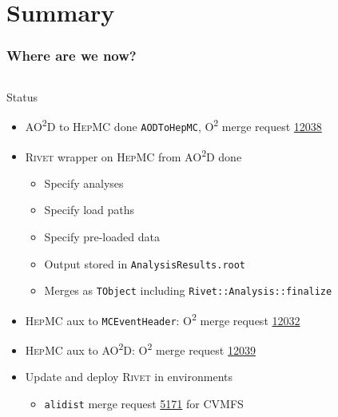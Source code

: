 \documentclass[compress,table,8pt]{beamer}
\newcommand\Rivet{{\scshape Rivet}}
\newcommand\HepMC{{\scshape HepMC}}
\newcommand\Otwo{O\textsuperscript{2}}
\newcommand\AOD{AO\textsuperscript{2}D}
\begin{document}
\section{Summary}
\begin{frame}
  \frametitle{Where are we now?}

  \begin{columns}[onlytextwidth,t]
    \begin{column}{.45\linewidth}
      \begin{block}{Status}
        \begin{itemize}
        \item<+-> \AOD{} to \HepMC{} done\newline%
          {\footnotesize \texttt{AODToHepMC}, \Otwo{} merge request
            \href{https://github.com/AliceO2Group/AliceO2/pull/12038}{12038}}
        \item<+-> \Rivet{} wrapper on \HepMC{} from \AOD{} done
          \begin{itemize}
          \item Specify analyses
          \item Specify load paths
          \item Specify pre-loaded data
          \item Output stored in
            \texttt{AnalysisResults.root}
          \item Merges as \texttt{TObject}\newline%
            {\footnotesize including
              \texttt{Rivet::Analysis::finalize}}
          \end{itemize}
        \item<+-> \HepMC{} aux to \texttt{MCEventHeader}: \Otwo{}
          merge request
          \href{https://github.com/AliceO2Group/AliceO2/pull/12032}{12032}
        \item<+-> \HepMC{} aux to \AOD{}: \Otwo{} merge request
          \href{https://github.com/AliceO2Group/AliceO2/pull/12039}{12039}
        \item<+-> Update and deploy \Rivet{} in environments
          \begin{itemize}
          \item \texttt{alidist} merge request
            \href{https://github.com/alisw/alidist/pull/5171}{5171}
            for CVMFS
          \end{itemize}
        \end{itemize}
      \end{block}

\end{column}
\end{columns}
\end{frame}
\end{document}
